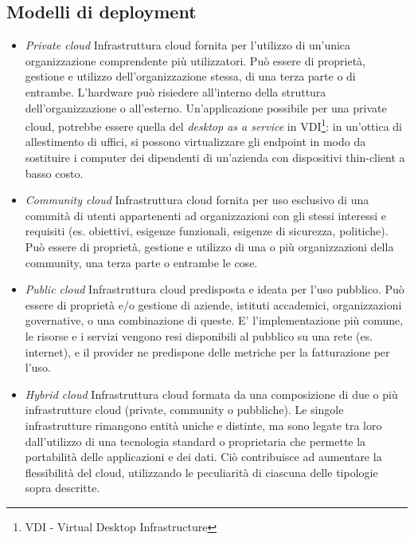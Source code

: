 \subsection{Modelli di deployment}
\begin{itemize}
\begin{figure}[H]
\centering
{}
\caption{Modelli di deployment}\label{fig:modellideployment}
\end{figure}
\item \textit{Private cloud}
Infrastruttura cloud fornita per l'utilizzo di un'unica organizzazione comprendente più utilizzatori. Può essere di proprietà, gestione e utilizzo dell'organizzazione stessa, di una terza parte o di entrambe.\cite{NISTCloud}
L'hardware può risiedere all'interno della struttura dell'organizzazione o all'esterno.
Un'applicazione possibile per una private cloud, potrebbe essere quella del \textit{desktop as a service} in VDI\footnote{VDI - Virtual Desktop Infrastructure}: in un'ottica di allestimento di uffici, si possono virtualizzare gli endpoint in modo da sostituire i computer dei dipendenti di un'azienda con dispositivi thin-client a basso costo.
\item \textit{Community cloud}
Infrastruttura cloud fornita per uso esclusivo di una comunità di utenti appartenenti ad organizzazioni con gli stessi interessi e requisiti (es. obiettivi, esigenze funzionali, esigenze di sicurezza, politiche). Può essere di proprietà, gestione e utilizzo di una o più organizzazioni della community, una terza parte o entrambe le cose.\cite{NISTCloud}
\item \textit{Public cloud}
Infrastruttura cloud predisposta e ideata per l'uso pubblico. Può essere di proprietà e/o gestione di aziende, istituti accademici, organizzazioni governative, o una combinazione di queste.\cite{NISTCloud}
E' l'implementazione più comune, le risorse e i servizi vengono resi disponibili al pubblico su una rete (es. internet), e il provider ne predispone delle metriche per la fatturazione per l'uso.
\item \textit{Hybrid cloud}
Infrastruttura cloud formata da una composizione di due o più infrastrutture cloud (private, community o pubbliche). Le singole infrastrutture rimangono entità uniche e distinte, ma sono legate tra loro dall'utilizzo di una tecnologia standard o proprietaria che permette la portabilità delle applicazioni e dei dati.\cite{NISTCloud} Ciò contribuisce ad aumentare la flessibilità del cloud, utilizzando le peculiarità di ciascuna delle tipologie sopra descritte.
\end{itemize}

